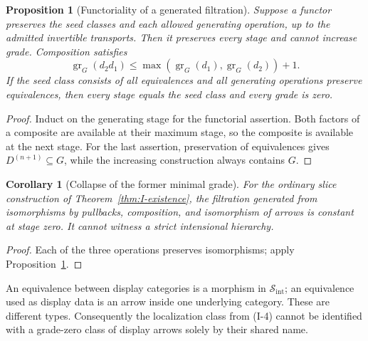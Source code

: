 \documentclass[11pt]{article}
\theoremstyle{plain}
\newtheorem{proposition}[theorem]{Proposition}
\newtheorem{corollary}[theorem]{Corollary}
\theoremstyle{definition}
\newcommand{\cS}{\mathcal{S}}
\newcommand{\gr}{\operatorname{gr}}
\newcommand{\Sint}{\cS_{\mathrm{int}}}
\begin{document}
\begin{proposition}[Functoriality of a generated filtration]\label{prop:grading}
Suppose a functor preserves the seed classes and each allowed generating operation, up to the admitted invertible transports. Then it preserves every stage and cannot increase grade. Composition satisfies
\[
 \gr_G(d_2d_1)\le\max(\gr_G(d_1),\gr_G(d_2))+1.
\]
If the seed class consists of all equivalences and all generating operations preserve equivalences, then every stage equals the seed class and every grade is zero.
\end{proposition}
\begin{proof}
Induct on the generating stage for the functorial assertion. Both factors of a composite are available at their maximum stage, so the composite is available at the next stage. For the last assertion, preservation of equivalences gives $D^{(n+1)}\subseteq G$, while the increasing construction always contains $G$.
\end{proof}

\begin{corollary}[Collapse of the former minimal grade]\label{cor:grade-collapse}
For the ordinary slice construction of Theorem~\ref{thm:I-existence}, the filtration generated from isomorphisms by pullbacks, composition, and isomorphism of arrows is constant at stage zero. It cannot witness a strict intensional hierarchy.
\end{corollary}
\begin{proof}
Each of the three operations preserves isomorphisms; apply Proposition~\ref{prop:grading}.
\end{proof}
An equivalence between display categories is a morphism in $\Sint$; an equivalence used as display data is an arrow inside one underlying category. These are different types. Consequently the localization class from (I-4) cannot be identified with a grade-zero class of display arrows solely by their shared name.
\end{document}
